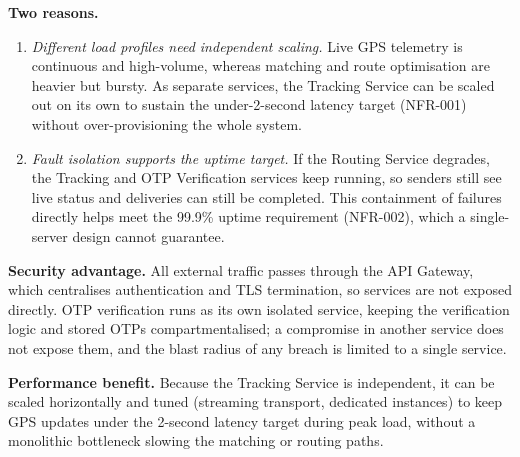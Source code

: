 \documentclass[11pt]{article}
\begin{document}
\textbf{Two reasons.}
\begin{enumerate}[leftmargin=1.5em,nosep]
\item \emph{Different load profiles need independent scaling.} Live GPS telemetry is continuous and high-volume, whereas matching and route optimisation are heavier but bursty. As separate services, the Tracking Service can be scaled out on its own to sustain the under-2-second latency target (NFR-001) without over-provisioning the whole system.
\item \emph{Fault isolation supports the uptime target.} If the Routing Service degrades, the Tracking and OTP Verification services keep running, so senders still see live status and deliveries can still be completed. This containment of failures directly helps meet the 99.9\% uptime requirement (NFR-002), which a single-server design cannot guarantee.
\end{enumerate}

\textbf{Security advantage.} All external traffic passes through the API Gateway, which centralises authentication and TLS termination, so services are not exposed directly. OTP verification runs as its own isolated service, keeping the verification logic and stored OTPs compartmentalised; a compromise in another service does not expose them, and the blast radius of any breach is limited to a single service.

\textbf{Performance benefit.} Because the Tracking Service is independent, it can be scaled horizontally and tuned (streaming transport, dedicated instances) to keep GPS updates under the 2-second latency target during peak load, without a monolithic bottleneck slowing the matching or routing paths.
\end{document}
